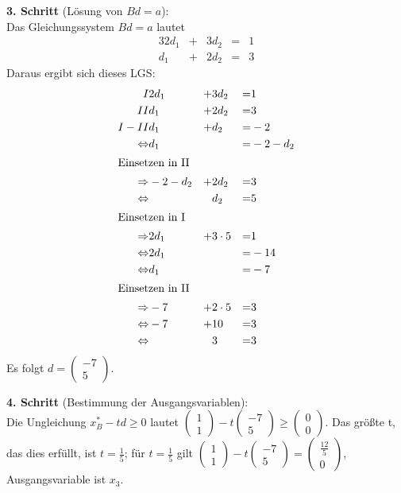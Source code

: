 \documentclass[10pt,a4paper,oneside,ngerman,numbers=noenddot]{scrartcl}
\begin{document}
		\textbf{3. Schritt} (Lösung von $Bd = a$):\\
		Das Gleichungssystem $Bd = a$ lautet
		\begin{alignat*}{3}
			2d_{1} &+& 3d_{2} &=& 1\\
			d_{1} &+& 2d_{2} &=& 3
		\end{alignat*}
		Daraus ergibt sich dieses LGS:
		\begin{alignat*}{3}
			I & 2d_{1} &+& 3d_{2} &=& 1 \\
			II & d_{1} &+& 2d_{2} &=& 3 \\
			I - II & d_{1} &+& d_{2} &=& -2 \\
			\Leftrightarrow & d_{1} && &=& -2 - d_{2} \\
			\intertext{Einsetzen in II}
			\Rightarrow & -2 - d_{2} &+& 2d_{2} &=& 3 \\
			\Leftrightarrow & && d_{2} &=& 5 \\
			\intertext{Einsetzen in I}
			\Rightarrow & 2d_{1} &+& 3 \cdot 5 &=& 1 \\
			\Leftrightarrow & 2d_{1} && &=& - 14 \\
			\Leftrightarrow & d_{1} && &=& -7 \\
			\intertext{Einsetzen in II}
			\Rightarrow & -7 &+& 2 \cdot 5 &=& 3 \\
			\Leftrightarrow & -7 &+& 10 &=& 3 \\
			\Leftrightarrow & && 3 &=& 3
		\end{alignat*}
		Es folgt $d = \begin{pmatrix} -7 \\ 5 \end{pmatrix}$.
		
		\textbf{4. Schritt} (Bestimmung der Ausgangsvariablen):\\
		Die Ungleichung $x_{B}^{*} - td \geq 0$ lautet $\begin{pmatrix} 1 \\ 1 \end{pmatrix} - t \begin{pmatrix}-7 \\ 5 \end{pmatrix} \geq \begin{pmatrix} 0 \\ 0  \end{pmatrix}$. Das größte t, das dies erfüllt, ist $t = \frac{1}{5}$; für $t = \frac{1}{5}$ gilt $\begin{pmatrix} 1 \\ 1\end{pmatrix} - t \begin{pmatrix} -7 \\ 5 \end{pmatrix} = \begin{pmatrix} \frac{12}{5} \\ 0 \end{pmatrix}$, Ausgangsvariable ist $x_{3}$.
		
\end{document}
